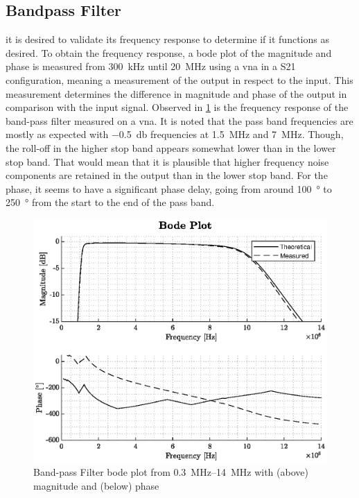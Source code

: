 
\subsection{Bandpass Filter}
it is desired to validate its frequency response to determine if it functions as desired. To obtain the frequency response, a bode plot of the magnitude and phase is measured from \qty{300}{\kilo\hertz} until \qty{20}{\mega\hertz} using a \gls{vna} in a S21 configuration, meaning a measurement of the output in respect to the input. This measurement determines the difference in magnitude and phase of the output in comparison with the input signal. Observed in \cref{fig:4_bpf_measurement} is the frequency response of the band-pass filter measured on a \gls{vna}. It is noted that the pass band frequencies are mostly as expected with \qty{-0.5}{\decibel} frequencies at \qty{1.5}{\mega\hertz} and \qty{7}{\mega\hertz}. Though, the roll-off in the higher stop band appears somewhat lower than in the lower stop band. That would mean that it is plausible that higher frequency noise components are retained in the output than in the lower stop band. For the phase, it seems to have a significant phase delay, going from around \qty{100}{\degree} to \qty{250}{\degree} from the start to the end of the pass band.
\begin{figure}[htbp]
	\centering
	\includegraphics[width=.8\textwidth]{Figures/4_bpf_measurement_vna.eps}
	\caption[Band-pass filter bode plot]{Band-pass Filter bode plot from \qtyrange{0.3}{14}{\mega\hertz} with (above) magnitude and (below) phase}
	\label{fig:4_bpf_measurement}
\end{figure}

